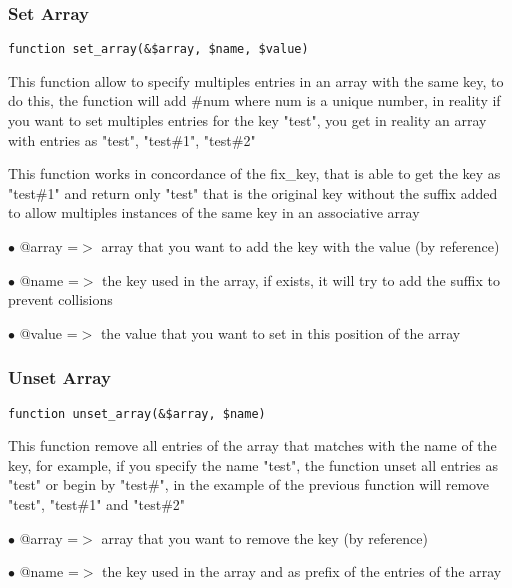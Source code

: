 \documentclass[a4paper]{article}
\begin{document}
\hypertarget{toc274}{}
\subsubsection{Set Array}

\begin{lstlisting}
function set_array(&$array, $name, $value)
\end{lstlisting}

This function allow to specify multiples entries in an array with the same key,
to do this, the function will add \#num where num is a unique number, in reality
if you want to set multiples entries for the key "test", you get in reality an
array with entries as "test", "test\#1", "test\#2"

This function works in concordance of the fix\_key, that is able to get the key
as "test\#1" and return only "test" that is the original key without the suffix
added to allow multiples instances of the same key in an associative array

\begin{compactitem}
\item[\color{myblue}$\bullet$] @array =$>$ array that you want to add the key with the value (by reference)
\item[\color{myblue}$\bullet$] @name  =$>$ the key used in the array, if exists, it will try to add the suffix to
          prevent collisions
\item[\color{myblue}$\bullet$] @value =$>$ the value that you want to set in this position of the array
\end{compactitem}

\hypertarget{toc275}{}
\subsubsection{Unset Array}

\begin{lstlisting}
function unset_array(&$array, $name)
\end{lstlisting}

This function remove all entries of the array that matches with the name of
the key, for example, if you specify the name "test", the function unset all
entries as "test" or begin by "test\#", in the example of the previous function
will remove "test", "test\#1" and "test\#2"

\begin{compactitem}
\item[\color{myblue}$\bullet$] @array =$>$ array that you want to remove the key (by reference)
\item[\color{myblue}$\bullet$] @name  =$>$ the key used in the array and as prefix of the entries of the array
\end{compactitem}
\end{document}
